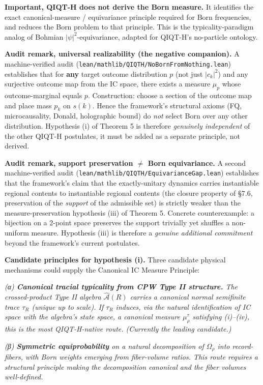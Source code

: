 \documentclass[11pt,a4paper]{article}
\begin{document}
\textbf{Important, QIQT-H does not derive the Born measure.} It identifies the exact canonical-measure / equivariance principle required for Born frequencies, and reduces the Born problem to that principle. This is the typicality-paradigm analog of Bohmian $|\psi|^2$-equivariance, adapted for QIQT-H's no-particle ontology.

\textbf{Audit remark, universal realizability (the negative companion).} A machine-verified audit (\texttt{lean/mathlib/QIQTH/NoBornFromNothing.lean}) establishes that for \textbf{any} target outcome distribution $p$ (not just $|c_k|^2$) and any surjective outcome map from the IC space, there exists a measure $\mu_p$ whose outcome-marginal equals $p$. Construction: choose a section of the outcome map and place mass $p_k$ on $s(k)$. Hence the framework's structural axioms (FQ, microcausality, Donald, holographic bound) do \emph{not} select Born over any other distribution. Hypothesis (i) of Theorem 5 is therefore \emph{genuinely independent} of the other QIQT-H postulates, it must be added as a separate principle, not derived.

\textbf{Audit remark, support preservation $\neq$ Born equivariance.} A second machine-verified audit (\texttt{lean/mathlib/QIQTH/EquivarianceGap.lean}) establishes that the framework's claim that the exactly-unitary dynamics carries instantiable regional contents to instantiable regional contents (the closure property of §7.6, preservation of the \emph{support} of the admissible set) is strictly weaker than the measure-preservation hypothesis (iii) of Theorem 5. Concrete counterexample: a bijection on a 2-point space preserves the support trivially yet shuffles a non-uniform measure. Hypothesis (iii) is therefore a \emph{genuine additional commitment} beyond the framework's current postulates.

\textbf{Candidate principles for hypothesis (i).} Three candidate physical mechanisms could supply the Canonical IC Measure Principle:

\emph{(α) \textbf{Canonical tracial typicality from CPW Type II structure.} The crossed-product Type II algebra $\hat{\mathcal{A}}(R)$ carries a canonical normal semifinite trace $\tau_R$ (unique up to scale). If $\tau_R$ induces, via the natural identification of IC space with the algebra's state space, a canonical measure $\mu_\rho^{\tau}$ satisfying (i)–(iv), this is the most QIQT-H-native route. (Currently the leading candidate.)}

\emph{(β) \textbf{Symmetric equiprobability} on a natural decomposition of $\Omega_\rho$ into record-fibers, with Born weights emerging from fiber-volume ratios. This route requires a structural principle making the decomposition canonical and the fiber volumes well-defined.}
\end{document}
